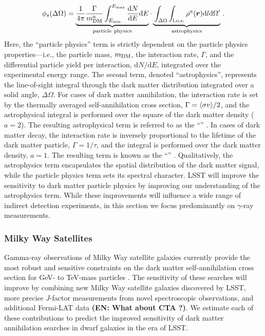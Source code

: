 \begin{equation}
   \phi_s(\Delta\Omega) =
    \underbrace{ \frac{1}{4\pi} \frac{\Gamma}{m_{\DM}^{a}}\int^{E_{\max}}_{E_{\min}}\frac{\text{d}N}{\text{d}E}\text{d}E}_{\rm particle\ physics}
    \cdot
    \underbrace{\vphantom{\int_{E_{\min}}} \int_{\Delta\Omega}\int_{\rm l.o.s.}\rho^{a}(\vect{r})\text{d}l\text{d}\Omega '}_{\rm astrophysics}\,.
    \label{eqn:indirect}
\end{equation}
\noindent Here, the ``particle physics'' term is strictly dependent on the particle physics properties---i.e., the particle mass, $m_{\mathrm{DM}}$,  the interaction rate, $\Gamma$, and the differential particle yield per interaction, $\text{d}N/\text{d}E$, integrated over the experimental energy range.
The second term, denoted ``astrophysics'', represents the line-of-sight integral through the dark matter distribution integrated over a solid angle, $\Delta\Omega$. 
For cases of dark matter annihilation, the interaction rate is set by the thermally averaged self-annihilation cross section, $\Gamma = \langle \sigma v \rangle/2$, and the astrophysical integral is performed over the square of the dark matter density ($a=2$). 
The resulting astrophysical term is referred to as the ``\Jfactor'' \citep[\eg,][]{1998APh.....9..137B}. 
In cases of dark matter decay, the interaction rate is inversely proportional to the lifetime of the dark matter particle, $\Gamma = 1/\tau$, and the integral is performed over the dark matter density, $a=1$. 
The resulting term is known as the ``\Dfactor'' \citep[\eg][]{1408.0002}.
Qualitatively, the astrophysics term encapsulates the spatial distribution of the dark matter signal, while the particle physics term sets its spectral character. 
LSST will improve the sensitivity to dark matter particle physics by improving our understanding of the astrophysics term.
While these improvements will influence a wide range of indirect detection experiments, in this section we focus predominantly on $\gamma$-ray measurements.


\subsubsection{Milky Way Satellites }

Gamma-ray observations of Milky Way satellite galaxies currently provide the most robust and sensitive constraints on the dark matter self-annihilation cross section for GeV- to TeV-mass particles \citep[\eg][]{Ackermann:2014, Geringer-Sameth:2015, Ackermann:2015}.
The sensitivity of these searches will improve by combining new Milky Way satellite galaxies discovered by LSST, more precise $J$-factor measurements from novel spectroscopic observations, and additional Fermi-LAT data {\bf (EN: What about CTA ?)}.
We estimate each of these contributions to predict the improved sensitivity of dark matter annihilation searches in dwarf galaxies in the era of LSST.

